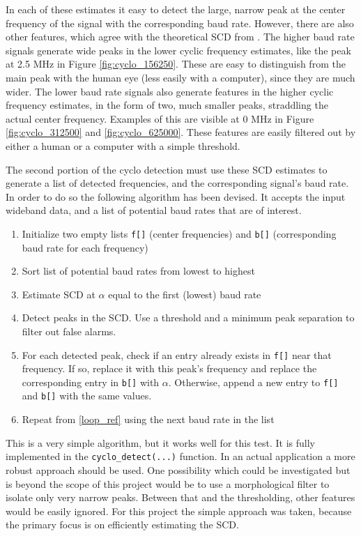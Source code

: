 \documentclass[12pt]{report}
\begin{document}
In each of these estimates it easy to detect the large, narrow peak at the
center frequency of the signal with the corresponding baud rate. However, there
are also other features, which agree with the theoretical SCD from
\cite{Gardner2}.  The higher baud rate signals generate wide peaks in the lower
cyclic frequency estimates, like the peak at 2.5 MHz in Figure
\ref{fig:cyclo_156250}. These are easy to distinguish from the main peak with
the human eye (less easily with a computer), since they are much wider. The
lower baud rate signals also generate features in the higher cyclic frequency
estimates, in the form of two, much smaller peaks, straddling the actual center
frequency. Examples of this are visible at 0 MHz in Figure
\ref{fig:cyclo_312500} and \ref{fig:cyclo_625000}. These features are easily
filtered out by either a human or a computer with a simple threshold.

The second portion of the cyclo detection must use these SCD estimates to 
generate a list of detected frequencies, and the corresponding signal's
baud rate. In order to do so the following algorithm has been devised. It accepts the input wideband data, and a list of potential baud rates that are of interest.

\begin{enumerate}
    \item Initialize two empty lists \texttt{f[]} (center frequencies) and \texttt{b[]} (corresponding baud rate for each frequency)
    \item Sort list of potential baud rates from lowest to highest
    \item Estimate SCD at $\alpha$ equal to the first (lowest) baud rate
    \label{loop_ref}
    \item Detect peaks in the SCD. Use a threshold and a minimum peak separation
        to filter out false alarms.
    \item For each detected peak, check if an entry already exists in
        \texttt{f[]} near that frequency. If so, replace it with this peak's
        frequency and replace the corresponding entry in \texttt{b[]} with
        $\alpha$. Otherwise, append a new entry to \texttt{f[]} and
        \texttt{b[]} with the same values.
    \item Repeat from \ref{loop_ref} using the next baud rate in the list
\end{enumerate}

This is a very simple algorithm, but it works well for this test. It is
fully implemented in the \texttt{cyclo\_detect(...)} function. In an actual
application a more robust approach should be used. One possibility which could
be investigated but is beyond the scope of this project would be to use
a morphological filter to isolate only very narrow peaks. Between that and the
thresholding, other features would be easily ignored. For this project the
simple approach was taken, because the primary focus is on efficiently
estimating the SCD.
\end{document}
